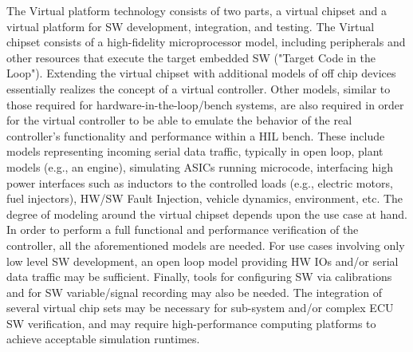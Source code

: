 The Virtual platform technology consists of two parts, a virtual chipset and a virtual platform for SW development, integration, and testing.
The Virtual chipset consists of a high-fidelity microprocessor model, including peripherals and other resources that execute the target embedded SW ("Target Code in the Loop").
Extending the virtual chipset with additional models of off chip devices essentially realizes the concept of a virtual controller.
Other models, similar to those required for hardware-in-the-loop/bench systems, are also required in order for the virtual controller to be able to emulate the behavior of the real controller's functionality and performance within a HIL bench.
These include models representing incoming serial data traffic, typically in open loop,
plant models (e.g., an engine), simulating ASICs running microcode, interfacing high power interfaces such as inductors to the controlled loads (e.g., electric motors, fuel injectors), HW/SW Fault Injection, vehicle dynamics, environment, etc.
The degree of modeling around the virtual chipset depends upon the use case at hand.
In order to perform a full functional and performance verification of the controller, all the aforementioned models are needed.
For use cases involving only low level SW development, an open loop model providing HW IOs and/or serial data traffic may be sufficient.
Finally, tools for configuring SW via calibrations and for SW variable/signal recording may also be needed. The integration of several virtual chip sets may be necessary for sub-system and/or complex ECU SW verification, and may require high-performance computing platforms to achieve acceptable simulation runtimes.
